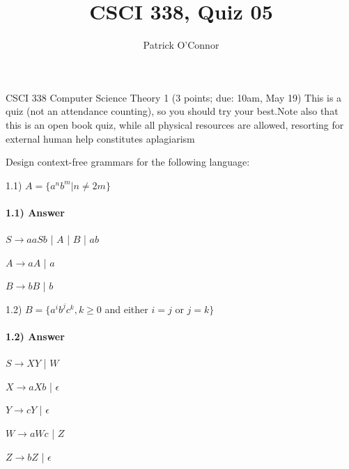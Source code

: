 \documentclass{article}
\title{CSCI 338, Quiz 05}
\author{Patrick O'Connor}
\begin{document}
\maketitle

CSCI 338 Computer Science Theory
1 (3 points; due: 10am, May 19)
This is a quiz (not an attendance counting), so you should 
try your best.Note also that this is an open book quiz, 
while all physical resources are allowed, resorting for external human 
help constitutes aplagiarism


Design context-free grammars for the following language:

1.1) $A= \{a^n b^m | n \neq 2m\}$
\paragraph{1.1) Answer}
\smallbreak

$S \longrightarrow aaSb$ | $A$ | $B$ | $ab$

$A \longrightarrow aA$ | $a$

$B \longrightarrow bB$ | $b$ 


\medbreak

1.2) $B= \{a^i b^j c^k , k\geq 0$ and either $ i=j$ or $j=k\}$
\paragraph{1.2) Answer}
\smallbreak
$S \longrightarrow XY$ | $W$ 

$X \longrightarrow aXb$ | $\epsilon$

$Y \longrightarrow cY$ | $\epsilon$

$W \longrightarrow aWc$ | $Z$

$Z \longrightarrow bZ$ | $\epsilon$
\end{document}
